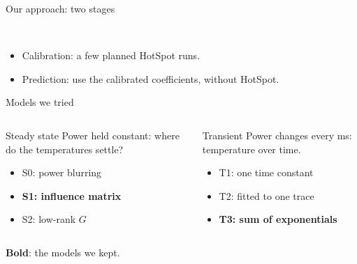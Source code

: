 \documentclass[aspectratio=169,14pt]{beamer}
\newcommand{\backup}[2]{\hfill\hyperlink{#1}{\beamerbutton{#2}}}
\begin{document}
\begin{frame}{Our approach: two stages}
  \centering
  \\[1em]
  \begin{itemize}
    \item Calibration: a few planned HotSpot runs.
    \item Prediction: use the calibrated coefficients, without HotSpot.
  \end{itemize}
\end{frame}

\begin{frame}{Models we tried}
  \begin{columns}[T]
      \begin{block}{Steady state}
        {\small Power held constant: where do the temperatures settle?}
        \begin{itemize}
          \item S0: power blurring \backup{b-s0}{more}
          \item \alert{\textbf{S1: influence matrix}}
          \item S2: low-rank $G$ \backup{b-s2}{more}
        \end{itemize}
      \end{block}
      \begin{block}{Transient}
        {\small Power changes every ms: temperature over time.}
        \begin{itemize}
          \item T1: one time constant \backup{b-t1}{more}
          \item T2: fitted to one trace \backup{b-t2}{more}
          \item \alert{\textbf{T3: sum of exponentials}}
        \end{itemize}
      \end{block}
  \end{columns}
  \vspace{0.8em}
  \centering \alert{\textbf{Bold}}: the models we kept.
\end{frame}
\end{document}
